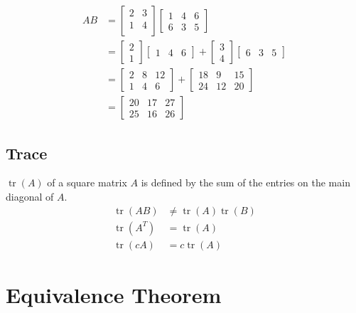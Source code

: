 \documentclass[12pt]{article}
\DeclareMathOperator{\tr}{tr}
\begin{document}
\begin{align*}
    AB &=
\left[ \begin{array}{c|c}
    2 & 3\\
    1 & 4\\
\end{array} \right]
\left[ \begin{array}{ccc}
    1 & 4 & 6\\
    \hline
    6 & 3 & 5
\end{array} \right]\\
    &=
    \begin{bmatrix}2\\1\end{bmatrix}
    \begin{bmatrix}1 & 4 & 6\end{bmatrix}
        +
    \begin{bmatrix}3\\4\end{bmatrix}
    \begin{bmatrix}6 & 3 & 5\end{bmatrix}
    \\
    &=
    \begin{bmatrix}2 & 8 & 12\\1 & 4 & 6\end{bmatrix}
        +
    \begin{bmatrix}18 & 9 & 15\\24 & 12 & 20\end{bmatrix}
    \\
    &=
    \begin{bmatrix}20&17&27\\25&16&26\end{bmatrix}
\end{align*}


\subsection{Trace}

$\tr(A)$ of a square matrix $A$ is defined by the sum of the entries on the main diagonal of $A$.\\
\begin{align*}
    \tr(AB) &\neq \tr(A)\tr(B)\\
    \tr(A^T) &= \tr(A)\\
    \tr(cA) &= c\tr(A)
\end{align*}


\section{Equivalence Theorem}
\end{document}
